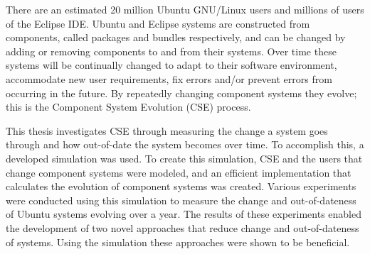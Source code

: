 There are an estimated 20 million Ubuntu GNU/Linux users and millions of users of the Eclipse IDE.
Ubuntu and Eclipse systems are constructed from components, called packages and bundles respectively, 
and can be changed by adding or removing components to and from their systems. 
Over time these systems will be continually changed to adapt to their software environment, accommodate new user requirements, 
fix errors and/or prevent errors from occurring in the future.
By repeatedly changing component systems they evolve; this is the Component System Evolution (CSE) process.

This thesis investigates CSE through measuring the change a system goes through and how out-of-date the system becomes over time.
To accomplish this, a developed simulation was used.
To create this simulation, CSE and the users that change component systems were modeled, 
and an efficient implementation that calculates the evolution of component systems was created.
Various experiments were conducted using this simulation to measure the change and out-of-dateness of Ubuntu systems evolving over a year. 
The results of these experiments enabled the development of two novel approaches that reduce change and out-of-dateness of systems.
Using the simulation these approaches were shown to be beneficial.

